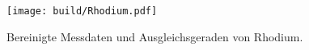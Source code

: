 \begin{figure}
\centering
\texttt{[image: build/Rhodium.pdf]}
\caption{Bereinigte Messdaten und Ausgleichsgeraden von Rhodium.}
\label{fig:R}
\end{figure}


%
